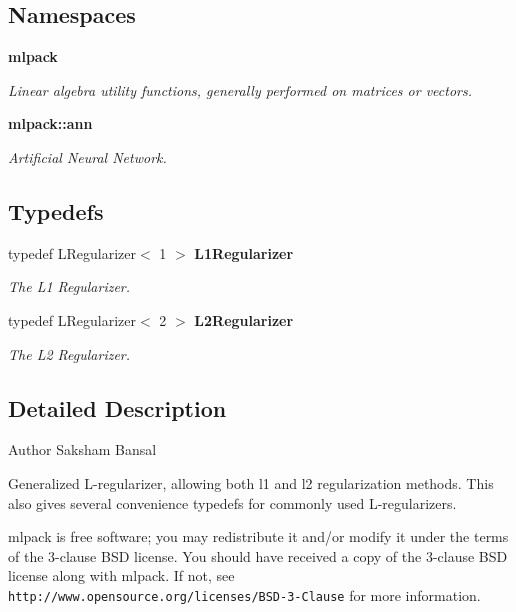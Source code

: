 \subsection*{Namespaces}
\begin{DoxyCompactItemize}
\item 
 \textbf{ mlpack}
\begin{DoxyCompactList}\small\item\em Linear algebra utility functions, generally performed on matrices or vectors. \end{DoxyCompactList}\item 
 \textbf{ mlpack\+::ann}
\begin{DoxyCompactList}\small\item\em Artificial Neural Network. \end{DoxyCompactList}\end{DoxyCompactItemize}
\subsection*{Typedefs}
\begin{DoxyCompactItemize}
\item 
typedef L\+Regularizer$<$ 1 $>$ \textbf{ L1\+Regularizer}
\begin{DoxyCompactList}\small\item\em The L1 Regularizer. \end{DoxyCompactList}\item 
typedef L\+Regularizer$<$ 2 $>$ \textbf{ L2\+Regularizer}
\begin{DoxyCompactList}\small\item\em The L2 Regularizer. \end{DoxyCompactList}\end{DoxyCompactItemize}


\subsection{Detailed Description}
\begin{DoxyAuthor}{Author}
Saksham Bansal
\end{DoxyAuthor}
Generalized L-\/regularizer, allowing both l1 and l2 regularization methods. This also gives several convenience typedefs for commonly used L-\/regularizers.

mlpack is free software; you may redistribute it and/or modify it under the terms of the 3-\/clause B\+SD license. You should have received a copy of the 3-\/clause B\+SD license along with mlpack. If not, see {\tt http\+://www.\+opensource.\+org/licenses/\+B\+S\+D-\/3-\/\+Clause} for more information. 